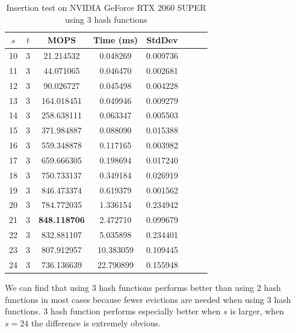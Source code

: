 \documentclass[10pt,twocolumn,letterpaper]{article}
\begin{document}
\begin{table}[h]
    \centering
   \begin{tabular}{@{}c|ccccccc@{}}
\toprule
$s$  & $t$ & MOPS    & Time (ms)& StdDev  \\ \midrule
10 & 3 & 21.214532 & 0.048269 & 0.009736 \\
11 & 3 & 44.071065 & 0.046470 & 0.002681 \\
12 & 3 & 90.026727 & 0.045498 & 0.004228 \\
13 & 3 & 164.018451 & 0.049946 & 0.009279 \\
14 & 3 & 258.638111 & 0.063347 & 0.005503 \\
15 & 3 & 371.984887 & 0.088090 & 0.015388 \\
16 & 3 & 559.348878 & 0.117165 & 0.003982 \\
17 & 3 & 659.666305 & 0.198694 & 0.017240 \\
18 & 3 & 750.733137 & 0.349184 & 0.026919 \\
19 & 3 & 846.473374 & 0.619379 & 0.001562 \\
20 & 3 & 784.772035 & 1.336154 & 0.234942 \\
21 & 3 & \textbf{848.118706} & 2.472710 & 0.099679 \\
22 & 3 & 832.881107 & 5.035898 & 0.234401 \\
23 & 3 & 807.912957 & 10.383059 & 0.109445 \\
24 & 3 & 736.136639 & 22.790899 & 0.155948 \\
\bottomrule
\end{tabular}
    \caption{Insertion test on NVIDIA GeForce RTX 2060 SUPER using $3$ hash functions}
    \label{tab:insert_3_2060}
\end{table}

We can find that using $3$ hash functions performs better than using $2$ hash functions in most cases because fewer evictions are needed when using $3$ hash functions. $3$ hash function performs especially better when $s$ is larger, when $s = 24$ the difference is extremely obvious.
\end{document}
